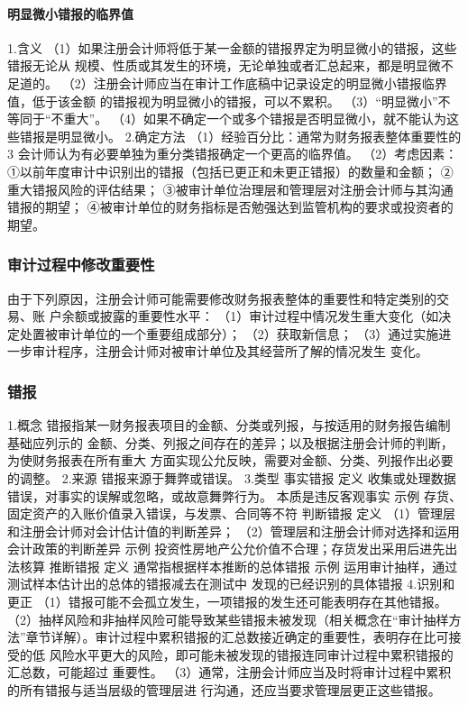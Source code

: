 \documentclass[UTF8,12pt]{ctexart}
\numberwithin{equation}{section} %
\numberwithin{figure}{section}
\numberwithin{table}{section}
\begin{document}
	\paragraph{明显微小错报的临界值}
	1.含义
	（1）如果注册会计师将低于某一金额的错报界定为明显微小的错报，这些错报无论从
	规模、性质或其发生的环境，无论单独或者汇总起来，都是明显微不足道的。
	（2）注册会计师应当在审计工作底稿中记录设定的明显微小错报临界值，低于该金额
	的错报视为明显微小的错报，可以不累积。
	（3）“明显微小”不等同于“不重大”。
	（4）如果不确定一个或多个错报是否明显微小，就不能认为这些错报是明显微小。
	2.确定方法
	（1）经验百分比：通常为财务报表整体重要性的3%
	会计师认为有必要单独为重分类错报确定一个更高的临界值。
	（2）考虑因素：
	①以前年度审计中识别出的错报（包括已更正和未更正错报）的数量和金额；
	②重大错报风险的评估结果；
	③被审计单位治理层和管理层对注册会计师与其沟通错报的期望；
	④被审计单位的财务指标是否勉强达到监管机构的要求或投资者的期望。
	
	\subsubsection{审计过程中修改重要性}
	由于下列原因，注册会计师可能需要修改财务报表整体的重要性和特定类别的交易、账
	户余额或披露的重要性水平：
	（1）审计过程中情况发生重大变化（如决定处置被审计单位的一个重要组成部分）；
	（2）获取新信息；
	（3）通过实施进一步审计程序，注册会计师对被审计单位及其经营所了解的情况发生
	变化。
	
	\subsubsection{错报}
	1.概念
	错报指某一财务报表项目的金额、分类或列报，与按适用的财务报告编制基础应列示的
	金额、分类、列报之间存在的差异；以及根据注册会计师的判断，为使财务报表在所有重大
	方面实现公允反映，需要对金额、分类、列报作出必要的调整。
	2.来源
	错报来源于舞弊或错误。
	3.类型
	事实错报
	定义
	收集或处理数据错误，对事实的误解或忽略，或故意舞弊行为。
	本质是违反客观事实
	示例
	存货、固定资产的入账价值录入错误，与发票、合同等不符
	判断错报
	定义
	（1）管理层和注册会计师对会计估计值的判断差异；
	（2）管理层和注册会计师对选择和运用会计政策的判断差异
	示例
	投资性房地产公允价值不合理；存货发出采用后进先出法核算
	推断错报
	定义
	通常指根据样本推断的总体错报
	示例
	运用审计抽样，通过测试样本估计出的总体的错报减去在测试中
	发现的已经识别的具体错报
	4.识别和更正
	（1）错报可能不会孤立发生，一项错报的发生还可能表明存在其他错报。
	（2）抽样风险和非抽样风险可能导致某些错报未被发现（相关概念在“审计抽样方
	法”章节详解）。审计过程中累积错报的汇总数接近确定的重要性，表明存在比可接受的低
	风险水平更大的风险，即可能未被发现的错报连同审计过程中累积错报的汇总数，可能超过
	重要性。
	（3）通常，注册会计师应当及时将审计过程中累积的所有错报与适当层级的管理层进
	行沟通，还应当要求管理层更正这些错报。
	
\end{document}
